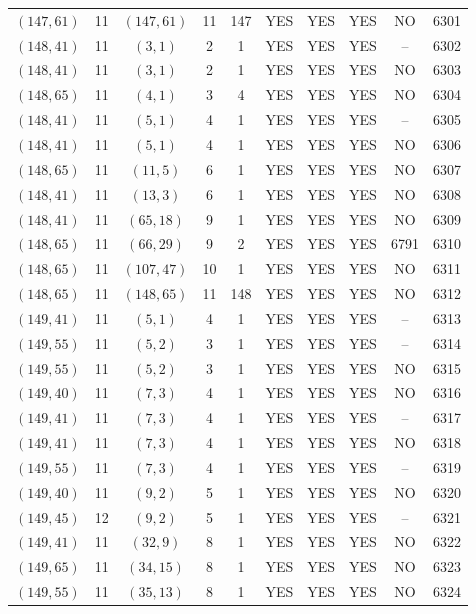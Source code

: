 \begin{longtable}{|c|c|c|c|c|c|c|c|c|c|}
$(147, 61)$ & 11 & $(147, 61)$ & 11 & 147 & YES & YES & YES & NO & 6301\\
$(148, 41)$ & 11 & $(3, 1)$ & 2 & 1 & YES & YES & YES & -- & 6302\\
$(148, 41)$ & 11 & $(3, 1)$ & 2 & 1 & YES & YES & YES & NO & 6303\\
$(148, 65)$ & 11 & $(4, 1)$ & 3 & 4 & YES & YES & YES & NO & 6304\\
$(148, 41)$ & 11 & $(5, 1)$ & 4 & 1 & YES & YES & YES & -- & 6305\\
$(148, 41)$ & 11 & $(5, 1)$ & 4 & 1 & YES & YES & YES & NO & 6306\\
$(148, 65)$ & 11 & $(11, 5)$ & 6 & 1 & YES & YES & YES & NO & 6307\\
$(148, 41)$ & 11 & $(13, 3)$ & 6 & 1 & YES & YES & YES & NO & 6308\\
$(148, 41)$ & 11 & $(65, 18)$ & 9 & 1 & YES & YES & YES & NO & 6309\\
$(148, 65)$ & 11 & $(66, 29)$ & 9 & 2 & YES & YES & YES & 6791 & 6310\\
$(148, 65)$ & 11 & $(107, 47)$ & 10 & 1 & YES & YES & YES & NO & 6311\\
$(148, 65)$ & 11 & $(148, 65)$ & 11 & 148 & YES & YES & YES & NO & 6312\\
$(149, 41)$ & 11 & $(5, 1)$ & 4 & 1 & YES & YES & YES & -- & 6313\\
$(149, 55)$ & 11 & $(5, 2)$ & 3 & 1 & YES & YES & YES & -- & 6314\\
$(149, 55)$ & 11 & $(5, 2)$ & 3 & 1 & YES & YES & YES & NO & 6315\\
$(149, 40)$ & 11 & $(7, 3)$ & 4 & 1 & YES & YES & YES & NO & 6316\\
$(149, 41)$ & 11 & $(7, 3)$ & 4 & 1 & YES & YES & YES & -- & 6317\\
$(149, 41)$ & 11 & $(7, 3)$ & 4 & 1 & YES & YES & YES & NO & 6318\\
$(149, 55)$ & 11 & $(7, 3)$ & 4 & 1 & YES & YES & YES & -- & 6319\\
$(149, 40)$ & 11 & $(9, 2)$ & 5 & 1 & YES & YES & YES & NO & 6320\\
$(149, 45)$ & 12 & $(9, 2)$ & 5 & 1 & YES & YES & YES & -- & 6321\\
$(149, 41)$ & 11 & $(32, 9)$ & 8 & 1 & YES & YES & YES & NO & 6322\\
$(149, 65)$ & 11 & $(34, 15)$ & 8 & 1 & YES & YES & YES & NO & 6323\\
$(149, 55)$ & 11 & $(35, 13)$ & 8 & 1 & YES & YES & YES & NO & 6324\\

\end{longtable}
